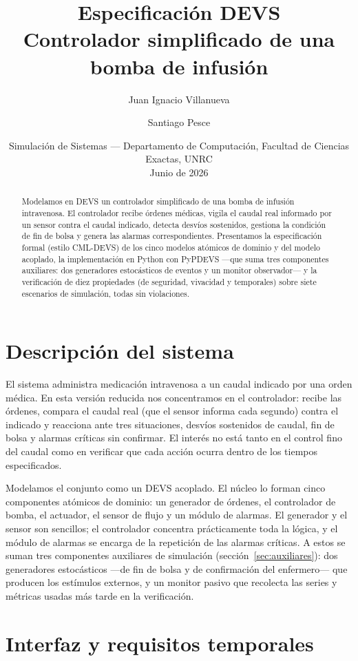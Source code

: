 \documentclass[11pt,a4paper]{article}
\title{\textbf{Especificación DEVS}\\[2pt]
\large Controlador simplificado de una bomba de infusión}
\author{Juan Ignacio Villanueva \and Santiago Pesce}
\date{Simulación de Sistemas --- Departamento de Computación, Facultad de Ciencias Exactas, UNRC\\[2pt]
Junio de 2026}
\begin{document}
\maketitle

\begin{abstract}
\noindent
Modelamos en DEVS un controlador simplificado de una bomba de infusión intravenosa. El controlador recibe órdenes médicas, vigila el caudal real informado por un sensor contra el caudal indicado, detecta desvíos sostenidos, gestiona la condición de fin de bolsa y genera las alarmas correspondientes. Presentamos la especificación formal (estilo CML-DEVS) de los cinco modelos atómicos de dominio y del modelo acoplado, la implementación en Python con PyPDEVS —que suma tres componentes auxiliares: dos generadores estocásticos de eventos y un monitor observador— y la verificación de diez propiedades (de seguridad, vivacidad y temporales) sobre siete escenarios de simulación, todas sin violaciones.
\end{abstract}

\section{Descripción del sistema}

El sistema administra medicación intravenosa a un caudal indicado por una orden médica. En esta versión reducida nos concentramos en el controlador: recibe las órdenes, compara el caudal real (que el sensor informa cada segundo) contra el indicado y reacciona ante tres situaciones, desvíos sostenidos de caudal, fin de bolsa y alarmas críticas sin confirmar. El interés no está tanto en el control fino del caudal como en verificar que cada acción ocurra dentro de los tiempos especificados.

Modelamos el conjunto como un DEVS acoplado. El núcleo lo forman cinco componentes atómicos de dominio: un generador de órdenes, el controlador de bomba, el actuador, el sensor de flujo y un módulo de alarmas. El generador y el sensor son sencillos; el controlador concentra prácticamente toda la lógica, y el módulo de alarmas se encarga de la repetición de las alarmas críticas. A estos se suman tres componentes auxiliares de simulación (sección~\ref{sec:auxiliares}): dos generadores estocásticos —de fin de bolsa y de confirmación del enfermero— que producen los estímulos externos, y un monitor pasivo que recolecta las series y métricas usadas más tarde en la verificación.

\section{Interfaz y requisitos temporales}
\end{document}
